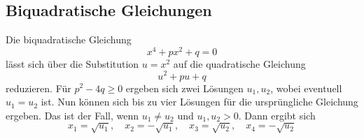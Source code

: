 \subsection{Biquadratische Gleichungen}%
Die biquadratische Gleichung
\begin{equation}
x^4+px^2+q = 0
\end{equation}
lässt sich über die Substitution $u=x^2$ auf die quadratische Gleichung
\begin{equation}
u^2+pu+q
\end{equation}
reduzieren. Für $p^2-4q\ge 0$ ergeben sich zwei Lösungen $u_1,u_2$,
wobei eventuell $u_1=u_2$ ist. Nun können sich bis zu vier Lösungen
für die ursprüngliche Gleichung ergeben. Das ist der Fall,
wenn $u_1\ne u_2$ und $u_1,u_2>0$. Dann
ergibt sich
\begin{equation}
x_1=\sqrt{u_1},\quad x_2=-\sqrt{u_1},\quad
x_3=\sqrt{u_2},\quad x_4=-\sqrt{u_2}
\end{equation}
